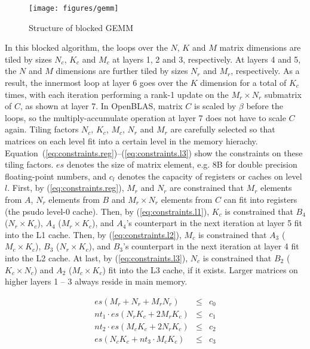 \begin{figure}[t]
  \centering
  \texttt{[image: figures/gemm]}
  \caption{Structure of blocked GEMM}
  \label{fig:gemm}
\end{figure}

In this blocked algorithm, the loops over the $N$, $K$ and $M$
matrix dimensions are tiled by sizes $N_c$, $K_c$ and $M_c$ at 
layers 1, 2 and 3, respectively.
At layers 4 and 5, the $N$ and $M$ dimensions are further tiled by sizes
$N_r$ and $M_r$, respectively.
As a result, the innermost loop at layer 6 goes over the $K$
dimension for a total of $K_c$ times,
with each iteration performing a rank-1 update on
the $M_r \times N_r$ submatrix of $C$, as shown at layer 7.
In OpenBLAS, matrix $C$ is scaled by $\beta$ before the loops,
so the multiply-accumulate operation at layer 7 does not have to scale $C$ again.
Tiling factors $N_c$, $K_c$, $M_c$, $N_r$ and $M_r$ are carefully selected so that
matrices on each level fit into a certain level in the memory hierachy.
Equation~(\ref{eq:constraints.reg})--(\ref{eq:constraints.l3}) show
the constraints on these tiling factors.
$es$ denotes the size of matrix element, e.g. 8B for double precision floating-point numbers,
and $c_l$ denotes the capacity of registers or caches on level $l$.
First, by (\ref{eq:constraints.reg}), $M_r$ and $N_r$ are constrained that $M_r$ elements from $A$,
$N_r$ elements from $B$ and $M_r \times N_r$ elements from $C$ can fit into registers
(the psudo level-0 cache).
Then, by (\ref{eq:constraints.l1}), $K_c$ is constrained that $B_4$ ($N_r \times K_c$),
$A_4$ ($M_r \times K_c$), and $A_4$'s counterpart in the next iteration
at layer 5 fit into the L1 cache.
Then, by (\ref{eq:constraints.l2}), $M_c$ is constrained that $A_3$ ($M_c \times K_c$),
$B_3$ ($N_r \times K_c$), and $B_3$'s counterpart in the next iteration
at layer 4 fit into the L2 cache.
At last, by (\ref{eq:constraints.l3}), $N_c$ is constrained that 
$B_2$ ($K_c \times N_c$) and $A_2$ ($M_c \times K_c$) fit into the L3 cache, if it exists.
Larger matrices on higher layers 1 -- 3 always reside in main memory.

\begin{eqnarray}
  es (M_r + N_r + M_r N_r) & \le & c_{0} \label{eq:constraints.reg}\\
  nt_{1} \cdot es (N_r K_c + 2 M_r K_c) & \le & c_{1} \label{eq:constraints.l1}\\
  nt_{2} \cdot es (M_c K_c + 2 N_r K_c) & \le & c_{2} \label{eq:constraints.l2}\\
  es (N_c K_c + nt_{3} \cdot M_c K_c)   & \le & c_{3} \label{eq:constraints.l3}
\end{eqnarray}

